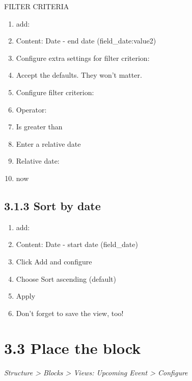 \documentclass[letterpaper,10pt,english]{sphinxmanual}
\begin{document}
FILTER CRITERIA
\begin{enumerate}
\item {} 
add:

\item {} 
Content: Date - end date (field\_date:value2)

\item {} 
Configure extra settings for filter criterion:

\item {} 
Accept the defaults. They won't matter.

\item {} 
Configure filter criterion:

\item {} 
Operator:

\item {} 
Is greater than

\item {} 
Enter a relative date

\item {} 
Relative date:

\item {} 
now

\end{enumerate}


\subsection{3.1.3 Sort by date}
\label{event_calendar:sort-by-date}\begin{enumerate}
\item {} 
add:

\item {} 
Content: Date - start date (field\_date)

\item {} 
Click Add and configure

\item {} 
Choose Sort ascending (default)

\item {} 
Apply

\item {} 
Don't forget to save the view, too!

\end{enumerate}


\section{3.3 Place the block}
\label{event_calendar:place-the-block}
\emph{Structure \textgreater{} Blocks \textgreater{} Views: Upcoming Event \textgreater{} Configure}
\end{document}
